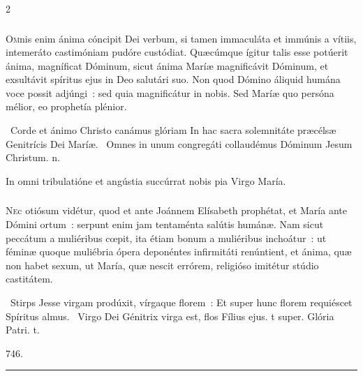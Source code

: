 \documentclass[9pt,twoside]{extarticle}
\begin{document}
\begin{multicols}{2}
\subsubsection*{\center {}}
\lettrine{O}mnis enim ánima cóncipit Dei verbum, si tamen immaculáta et immúnis a vítiis, intemeráto castimóniam pudóre custódiat. Quæcúmque ígitur talis esse potúerit ánima, magníficat Dóminum, sicut ánima Maríæ magnificávit Dóminum, et exsultávit spíritus ejus in Deo salutári suo. Non quod Dómino áliquid humána voce possit adjúngi~: sed quia magnificátur in nobis. Sed Maríæ quo persóna mélior, eo prophetía plénior.

\begin{tightlist}{}
\item {}~Corde et ánimo Christo canámus glóriam \textred{*} In hac sacra solemnitáte præcélsæ Genitrícis Dei Maríæ. ~Omnes in unum congregáti collaudémus Dóminum Jesum Christum. n.
\item {} In omni tribulatióne et angústia succúrrat nobis pia Virgo María.
\end{tightlist}

\subsubsection*{\center {}}
\lettrine{N}ec otiósum vidétur, quod et ante Joánnem Elísabeth prophétat, et María ante Dómini ortum~: serpunt enim jam tentaménta salútis humánæ. Nam sicut peccátum a muliéribus cœpit, ita étiam bonum a muliéribus inchoátur~: ut féminæ quoque muliébria ópera deponéntes infirmitáti renúntient, et ánima, quæ non habet sexum, ut María, quæ nescit errórem, religióso imitétur stúdio castitátem.

\begin{tightlist}{}
\item {}~Stirps Jesse virgam prodúxit, vírgaque florem~: \textred{*} Et super hunc florem requiéscet Spíritus almus. ~Virgo Dei Génitrix virga est, flos Fílius ejus. t super. Glória Patri. t. 
\item {} 746.
\end{tightlist}

\begin{center}\textcolor{red}{\rule{\linewidth}{0.5pt}} \end{center}


\end{multicols}
\end{document}
